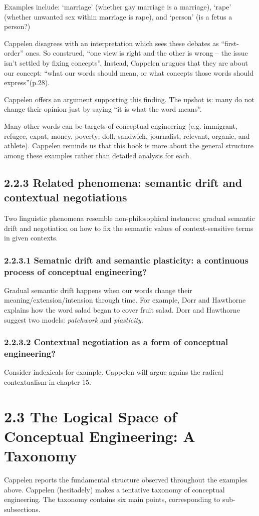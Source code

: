 \documentclass[
10pt, %
a4paper, %
twocolumn, %
landscape %
]{article}
\begin{document}
Examples include:
`marriage' (whether gay marriage is a marriage), `rape' (whether unwanted sex within marriage is rape), and `person' (is a fetus a person?)

Cappelen disagrees with an interpretation which sees these debates as ``first-order'' ones. So construed, ``one view is right and the other is wrong -- the issue isn't settled by fixing concepts''.
Instead, Cappelen arugues that they are about our concept: ``what our words should mean, or what concepts those words should express''(p.28).

Cappelen offers an argument supporting this finding. The upshot is: many do not change their opinion just by saying ``it is what the word means''.

Many other words can be targets of conceptual engineering (e.g. immigrant, refugee, expat, money, poverty; doll, sandwich, journalist, relevant, organic, and athlete).
Cappelen reminds us that this book is more about the general structure among these examples rather than detailed analysis for each.

\subsection*{2.2.3 Related phenomena: semantic drift and contextual negotiations}
Two linguistic phenomena resemble non-philosophical instances: gradual semantic drift and negotiation on how to fix the semantic values of context-sensitive terms in given contexts.

\subsubsection*{2.2.3.1 Sematnic drift and semantic plasticity: a continuous process of conceptual engineering?}
Gradual semantic drift happens when our words change their meaning/extension/intension through time.
For example, Dorr and Hawthorne explains how the word salad began to cover fruit salad. Dorr and Hawthorne suggest two models: \emph{patchwork} and \emph{plasticity}.

\subsubsection*{2.2.3.2 Contextual negotiation as a form of conceptual engineering?}
Consider indexicals for example.
Cappelen will argue agains the radical contextualism in chapter 15.


\section*{2.3 The Logical Space of Conceptual Engineering: A Taxonomy}
Cappelen reports the fundamental structure observed throughout the examples above.
Cappelen (hesitadely) makes a tentative taxonomy of conceptual engineering. The taxonomy contains six main points, corresponding to sub-subsections.
\end{document}
